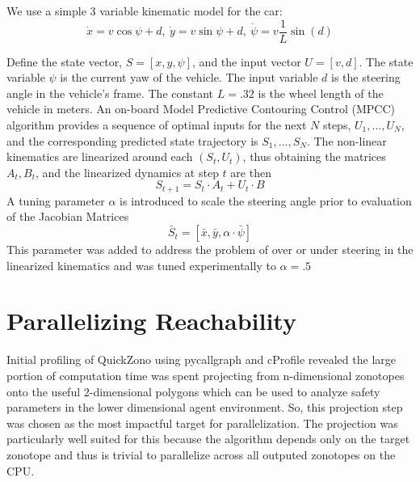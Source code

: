 \documentclass[runningheads]{llncs}
\begin{document}
We use a simple 3 variable kinematic model for the car:
\begin{equation}
\dot{x} = v \cos{\psi + d},~\dot{y} = v \sin{\psi + d},~\dot{\psi} = v \frac{1}{L} \sin(d)
\end{equation}

Define the state vector, $S= [x, y, \psi]$, and the input vector  $U = [v, d]$.
The state variable $\psi$ is the current yaw of the vehicle. The input variable $d$ is the steering angle in the vehicle's frame. The constant $L=.32$ is the wheel length of the vehicle in meters. 
An on-board Model Predictive Contouring Control  (MPCC) algorithm provides a sequence of optimal inputs for the next $N$ steps, $U_1,...,U_N$, and the corresponding predicted state trajectory is $S_1,...,S_N$. 
The non-linear kinematics are linearized around each $(S_t,U_t)$, thus obtaining the matrices $A_t,B_t$, and the linearized dynamics at step $t$ are then 
$$S_{t+1} = S_t \cdot A_t + U_t \cdot B$$
A tuning parameter $\alpha$ is introduced to scale the steering angle prior to evaluation of the Jacobian Matrices 
$$\bar{S}_t = [\bar{x}, \bar{y}, \alpha\cdot\bar{\psi}]$$
This parameter was added to address the problem of over or under steering in the linearized kinematics and was tuned experimentally to $\alpha=.5$ 


\section{Parallelizing Reachability}
Initial profiling of QuickZono using pycallgraph and cProfile revealed the large portion of computation time was spent projecting from n-dimensional zonotopes onto the useful 2-dimensional polygons which can be used to analyze safety parameters in the lower dimensional agent environment. So, this projection step was chosen as the most impactful target for parallelization. The projection was particularly well suited for this because the algorithm depends only on the target zonotope and thus is trivial to parallelize across all outputed zonotopes on the CPU.
\end{document}
